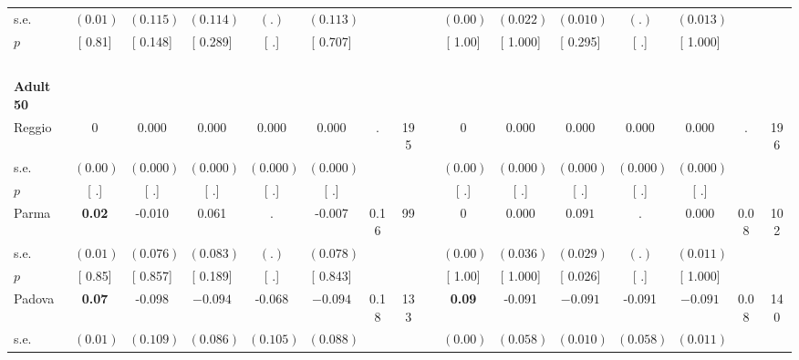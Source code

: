 \begin{longtable}{L{8em} c c c c c c c p{1em} c c c c c c c}
\quad \quad \quad \quad s.e.& $ (     0.01)$ & $ (    0.115)$ & $ (    0.114)$ & $ (        .)$ & $ (    0.113)$ & & & & $ (     0.00)$ & $ (    0.022)$ & $ (    0.010)$ & $ (        .)$ & $ (    0.013)$ & &  \\*
\quad \quad \quad \quad $ p$ & [     0.81] & [    0.148] & [    0.289] & [        .] & [    0.707] & & & & [     1.00] & [    1.000] & [    0.295] & [        .] & [    1.000] & &  \\[1em]
~\\[1em]
\quad \quad \textbf{Adult 50} & & & & & & & & & & & & & & & \\* 
\quad \quad \quad Reggio& 0 &     0.000 &     0.000 &     0.000 &     0.000 &         . &       195 & & 0 &     0.000 &     0.000 &     0.000 &     0.000 &         . &       196  \\*
\quad \quad \quad \quad s.e.& $ (     0.00)$ & $ (    0.000)$ & $ (    0.000)$ & $ (    0.000)$ & $ (    0.000)$ & & & & $ (     0.00)$ & $ (    0.000)$ & $ (    0.000)$ & $ (    0.000)$ & $ (    0.000)$ & &  \\*
\quad \quad \quad \quad $ p$ & [        .] & [        .] & [        .] & [        .] & [        .] & & & & [        .] & [        .] & [        .] & [        .] & [        .] & &  \\[1em]
\quad \quad \quad Parma& \textbf{     0.02} &    -0.010 &     0.061 &         . &    -0.007 &      0.16 &        99 & & 0 &     0.000 & $ \mathbf{    0.091}$ &         . &     0.000 &      0.08 &       102  \\*
\quad \quad \quad \quad s.e.& $ (     0.01)$ & $ (    0.076)$ & $ (    0.083)$ & $ (        .)$ & $ (    0.078)$ & & & & $ (     0.00)$ & $ (    0.036)$ & $ (    0.029)$ & $ (        .)$ & $ (    0.011)$ & &  \\*
\quad \quad \quad \quad $ p$ & [     0.85] & [    0.857] & [    0.189] & [        .] & [    0.843] & & & & [     1.00] & [    1.000] & [    0.026] & [        .] & [    1.000] & &  \\[1em]
\quad \quad \quad Padova& \textbf{     0.07} &    -0.098 & $ \mathbf{   -0.094}$ &    -0.068 & $ \mathbf{   -0.094}$ &      0.18 &       133 & & \textbf{     0.09} &    -0.091 & $ \mathbf{   -0.091}$ &    -0.091 & $ \mathbf{   -0.091}$ &      0.08 &       140  \\*
\quad \quad \quad \quad s.e.& $ (     0.01)$ & $ (    0.109)$ & $ (    0.086)$ & $ (    0.105)$ & $ (    0.088)$ & & & & $ (     0.00)$ & $ (    0.058)$ & $ (    0.010)$ & $ (    0.058)$ & $ (    0.011)$ & &  \\*

\end{longtable}
